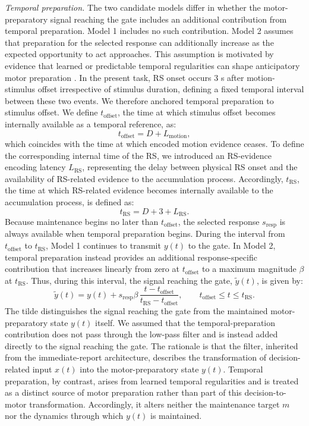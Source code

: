 \documentclass[a4paper,11pt]{article}
\theoremstyle{definition}
\newcommand{\1}{\mathbbm{1}}
\begin{document}
\emph{Temporal preparation.} The two candidate models differ in whether the motor-preparatory signal reaching the gate includes an additional contribution from temporal preparation. Model 1 includes no such contribution. Model 2 assumes that preparation for the selected response can additionally increase as the expected opportunity to act approaches. This assumption is motivated by evidence that learned or predictable temporal regularities can shape anticipatory motor preparation \parencites{heidemanTemporalAlignmentAnticipatory2018}{liBetaOscillationsInternal2026}{ramayyaHumanResponseTimes2025}. In the present task, RS onset occurs 3 s after motion-stimulus offset irrespective of stimulus duration, defining a fixed temporal interval between these two events. We therefore anchored temporal preparation to stimulus offset. We define $t_{\mathrm{offset}}$, the time at which stimulus offset becomes internally available as a temporal reference, as:
\[ t_{\mathrm{offset}}=D+L_{\mathrm{motion}}, \]
which coincides with the time at which encoded motion evidence ceases. To define the corresponding internal time of the RS, we introduced an RS-evidence encoding latency $L_{\mathrm{RS}}$, representing the delay between physical RS onset and the availability of RS-related evidence to the accumulation process. Accordingly, $t_{\mathrm{RS}}$, the time at which RS-related evidence becomes internally available to the accumulation process, is defined as:
\[ t_{\mathrm{RS}}=D+3+L_{\mathrm{RS}}. \]
Because maintenance begins no later than $t_{\mathrm{offset}}$, the selected response $s_{\mathrm{resp}}$ is always available when temporal preparation begins. During the interval from $t_{\mathrm{offset}}$ to $t_{\mathrm{RS}}$, Model 1 continues to transmit $y(t)$ to the gate. In Model 2, temporal preparation instead provides an additional response-specific contribution that increases linearly from zero at $t_{\mathrm{offset}}$ to a maximum magnitude $\beta$ at $t_{\mathrm{RS}}$. Thus, during this interval, the signal reaching the gate, $\tilde{y}(t)$, is given by:
\begin{equation}
\tilde{y}(t)= y(t)+s_{\mathrm{resp}}\beta\,\frac{t-t_{\mathrm{offset}}}{t_{\mathrm{RS}}-t_{\mathrm{offset}}}, \qquad t_{\mathrm{offset}}\le t\le t_{\mathrm{RS}}.
\label{eq:tildey}
\end{equation}
The tilde distinguishes the signal reaching the gate from the maintained motor-preparatory state $y(t)$ itself. We assumed that the temporal-preparation contribution does not pass through the low-pass filter and is instead added directly to the signal reaching the gate. The rationale is that the filter, inherited from the immediate-report architecture, describes the transformation of decision-related input $x(t)$ into the motor-preparatory state $y(t)$. Temporal preparation, by contrast, arises from learned temporal regularities and is treated as a distinct source of motor preparation rather than part of this decision-to-motor transformation. Accordingly, it alters neither the maintenance target $m$ nor the dynamics through which $y(t)$ is maintained.
\end{document}
